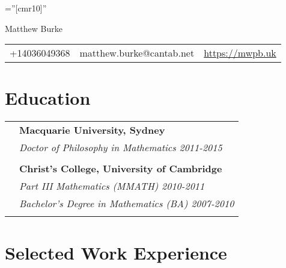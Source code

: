 \documentclass[a4paper,10pt]{article}
\begin{document}
\pagestyle{empty} %

\font\fb=''[cmr10]'' %

\par{\vspace{-2.0cm}\centering
  {\Huge {\sc Matthew Burke}
  }\bigskip\par}

\begin{tabu}{X[1 r]|X[1 c]|X[1 l]}
  +14036049368  & matthew.burke@cantab.net & \url{https://mwpb.uk}
\end{tabu}

\section{Education}

\begin{tabular}{rl}	
  & \textbf{Macquarie University, Sydney}\\
                     & \textit{Doctor of Philosophy in Mathematics 2011-2015}\\
                     &\\
  & \textbf{Christ's College, University of Cambridge}\\
                     & \textit{Part III Mathematics (MMATH) 2010-2011}\\
                     & \textit{Bachelor's Degree in Mathematics (BA) 2007-2010}\\
                     &\\
\end{tabular}

\section{Selected Work Experience}
\end{document}
